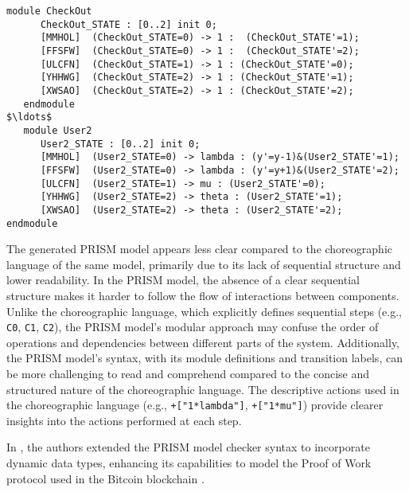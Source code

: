  \begin{lstlisting}[style=prism-color,caption={Generated PRISM program},captionpos=b,label={ex1-gen}]
   module CheckOut
      CheckOut_STATE : [0..2] init 0;
      [MMHOL]  (CheckOut_STATE=0) -> 1 :  (CheckOut_STATE'=1);
      [FFSFW]  (CheckOut_STATE=0) -> 1 :  (CheckOut_STATE'=2);
      [ULCFN]  (CheckOut_STATE=1) -> 1 : (CheckOut_STATE'=0);
      [YHHWG]  (CheckOut_STATE=2) -> 1 : (CheckOut_STATE'=1);
      [XWSAO]  (CheckOut_STATE=2) -> 1 : (CheckOut_STATE'=2);
   endmodule
$\ldots$
   module User2
      User2_STATE : [0..2] init 0;
      [MMHOL]  (User2_STATE=0) -> lambda : (y'=y-1)&(User2_STATE'=1);
      [FFSFW]  (User2_STATE=0) -> lambda : (y'=y+1)&(User2_STATE'=2);
      [ULCFN]  (User2_STATE=1) -> mu : (User2_STATE'=0);
      [YHHWG]  (User2_STATE=2) -> theta : (User2_STATE'=1);
      [XWSAO]  (User2_STATE=2) -> theta : (User2_STATE'=2);
endmodule
\end{lstlisting}
The generated PRISM model appears less clear compared to the choreographic language of the same model, primarily due to its lack of sequential structure and lower readability. 
In the PRISM model, the absence of a clear sequential structure makes it harder to follow the flow 
of interactions between components. Unlike the choreographic language, which explicitly defines 
sequential steps (e.g., \texttt{C0}, \texttt{C1}, \texttt{C2}), the PRISM model's modular approach 
may confuse the order of operations and dependencies between different parts of the system.
Additionally, the PRISM model's syntax, with its module definitions and transition labels, can be 
more challenging to read and comprehend compared to the concise and structured nature of the 
choreographic language. The descriptive actions used in the choreographic language (e.g., 
\texttt{+["1*lambda"]}, \texttt{+["1*mu"]}) provide clearer insights into the actions performed at each step.


\begin{comment}
\begin{wrapfigure}[11]{r}{4cm}
	\texttt{[image: bitcoin.pdf]}	
\end{wrapfigure} 
\end{comment}
In \cite{DBLP:journals/concurrency/BistarelliNGLMV23}, the authors extended the PRISM model checker syntax to incorporate dynamic data types, enhancing its capabilities to model the Proof of Work protocol used in the Bitcoin blockchain \cite{bitcoin}. 

